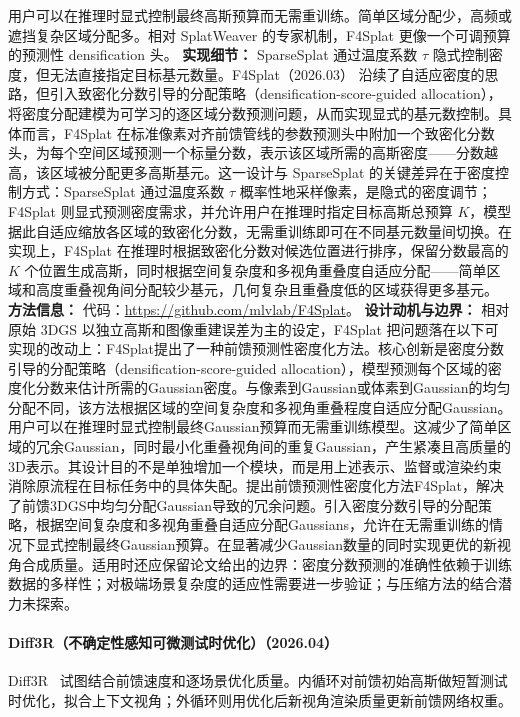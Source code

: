 用户可以在推理时显式控制最终高斯预算而无需重训练。简单区域分配少，高频或遮挡复杂区域分配多。相对 SplatWeaver 的专家机制，F4Splat 更像一个可调预算的预测性 densification 头。
\textbf{实现细节：} SparseSplat 通过温度系数 $\tau$ 隐式控制密度，但无法直接指定目标基元数量。F4Splat（2026.03） 沿续了自适应密度的思路，但引入致密化分数引导的分配策略（densification-score-guided allocation），将密度分配建模为可学习的逐区域分数预测问题，从而实现显式的基元数控制。具体而言，F4Splat 在标准像素对齐前馈管线的参数预测头中附加一个致密化分数头，为每个空间区域预测一个标量分数，表示该区域所需的高斯密度——分数越高，该区域被分配更多高斯基元。这一设计与 SparseSplat 的关键差异在于密度控制方式：SparseSplat 通过温度系数 $\tau$ 概率性地采样像素，是隐式的密度调节；F4Splat 则显式预测密度需求，并允许用户在推理时指定目标高斯总预算 $K$，模型据此自适应缩放各区域的致密化分数，无需重训练即可在不同基元数量间切换。在实现上，F4Splat 在推理时根据致密化分数对候选位置进行排序，保留分数最高的 $K$ 个位置生成高斯，同时根据空间复杂度和多视角重叠度自适应分配——简单区域和高度重叠视角间分配较少基元，几何复杂且重叠度低的区域获得更多基元。
\textbf{方法信息：} 代码：\url{https://github.com/mlvlab/F4Splat}。
\textbf{设计动机与边界：} 相对原始 3DGS 以独立高斯和图像重建误差为主的设定，F4Splat 把问题落在以下可实现的改动上：F4Splat提出了一种前馈预测性密度化方法。核心创新是密度分数引导的分配策略（densification-score-guided allocation），模型预测每个区域的密度化分数来估计所需的Gaussian密度。与像素到Gaussian或体素到Gaussian的均匀分配不同，该方法根据区域的空间复杂度和多视角重叠程度自适应分配Gaussian。用户可以在推理时显式控制最终Gaussian预算而无需重训练模型。这减少了简单区域的冗余Gaussian，同时最小化重叠视角间的重复Gaussian，产生紧凑且高质量的3D表示。其设计目的不是单独增加一个模块，而是用上述表示、监督或渲染约束消除原流程在目标任务中的具体失配。提出前馈预测性密度化方法F4Splat，解决了前馈3DGS中均匀分配Gaussian导致的冗余问题。引入密度分数引导的分配策略，根据空间复杂度和多视角重叠自适应分配Gaussians，允许在无需重训练的情况下显式控制最终Gaussian预算。在显著减少Gaussian数量的同时实现更优的新视角合成质量。适用时还应保留论文给出的边界：密度分数预测的准确性依赖于训练数据的多样性；对极端场景复杂度的适应性需要进一步验证；与压缩方法的结合潜力未探索。
\paragraph{Diff3R（不确定性感知可微测试时优化）（2026.04）}
Diff3R~\cite{2604_01030} 试图结合前馈速度和逐场景优化质量。内循环对前馈初始高斯做短暂测试时优化，拟合上下文视角；外循环则用优化后新视角渲染质量更新前馈网络权重。

